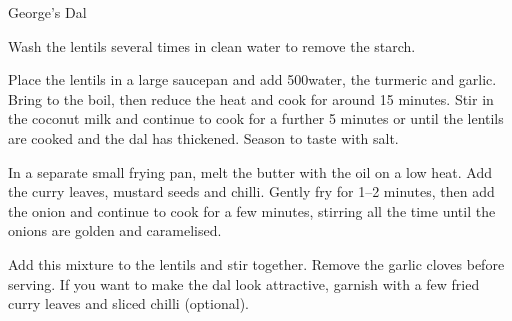 \begin{recipe}{George's Dal}

    \begin{ingredients}
    \end{ingredients}

    \begin{instructions}
        Wash the lentils several times in clean water to remove the starch.

        Place the lentils in a large saucepan and add 500\ml water, the turmeric and garlic. Bring to the boil, then reduce the heat and cook for around 15 minutes. Stir in the coconut milk and continue to cook for a further 5 minutes or until the lentils are cooked and the dal has thickened. Season to taste with salt.

        In a separate small frying pan, melt the butter with the oil on a low heat. Add the curry leaves, mustard seeds and chilli. Gently fry for 1–2 minutes, then add the onion and continue to cook for a few minutes, stirring all the time until the onions are golden and caramelised.

        Add this mixture to the lentils and stir together. Remove the garlic cloves before serving. If you want to make the dal look attractive, garnish with a few fried curry leaves and sliced chilli (optional).
    \end{instructions}
\end{recipe}
